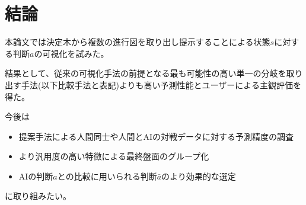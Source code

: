 \chapter{結論}
本論文では決定木から複数の進行図を取り出し提示することによる状態$s$に対する判断$a$の可視化を試みた。

結果として、従来の可視化手法の前提となる最も可能性の高い単一の分岐を取り出す手法(以下比較手法と表記)よりも高い予測性能とユーザーによる主観評価を得た。

今後は
\begin{itemize}
	\item 提案手法による人間同士や人間とAIの対戦データに対する予測精度の調査
	\item より汎用度の高い特徴による最終盤面のグループ化
	\item AIの判断$a$との比較に用いられる判断$\bar{a}$のより効果的な選定
\end{itemize}


に取り組みたい。
